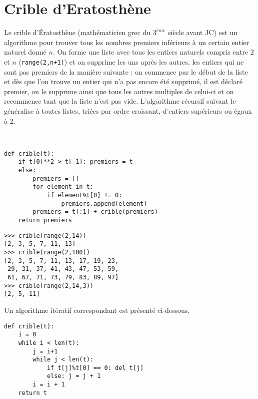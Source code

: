 \section*{Crible d'Eratosthène}
Le crible d'Ératosthène (mathématicien grec du $3^{\grave eme}$ siècle avant JC)
est un algorithme pour trouver tous les nombres premiers inférieurs à 
un certain entier naturel donné $n$.
On forme une liste avec tous les entiers naturels compris entre 2 et $n$ 
({\tt range(2,n+1)}) et on supprime les uns après les autres, 
les entiers qui ne sont pas premiers de la manière suivante : 
on commence par le début de la liste et dès que l'on trouve un entier 
qui n'a pas encore été supprimé, il est déclaré premier, on le supprime
ainsi que tous les autres multiples de celui-ci et on recommence tant que
la liste n'est pas vide. L'algorithme récursif suivant le généralise
à toutes listes, triées par ordre croissant, d'entiers supérieurs ou égaux à 2.

\mbox{}\ \ \begin{py}{8cm}
\begin{verbatim}
def crible(t):
    if t[0]**2 > t[-1]: premiers = t
    else:
        premiers = []
        for element in t:
            if element%t[0] != 0:
                premiers.append(element)
        premiers = t[:1] + crible(premiers)
    return premiers
\end{verbatim}
\end{py}
\hfill
\begin{py}{5cm}
\begin{verbatim}
>>> crible(range(2,14))
[2, 3, 5, 7, 11, 13]
>>> crible(range(2,100))
[2, 3, 5, 7, 11, 13, 17, 19, 23,
 29, 31, 37, 41, 43, 47, 53, 59, 
 61, 67, 71, 73, 79, 83, 89, 97] 
>>> crible(range(2,14,3))
[2, 5, 11]
\end{verbatim}
\end{py}
\vspace*{2mm}

\noindent Un algorithme itératif correspondant est présenté ci-dessous.

\begin{lstlisting}[caption={\bf Crible d'Eratostène},label=cl:eratostene]
def crible(t):
    i = 0
    while i < len(t):
        j = i+1
        while j < len(t):
            if t[j]%t[0] == 0: del t[j]
            else: j = j + 1
        i = i + 1    
    return t
\end{lstlisting}

